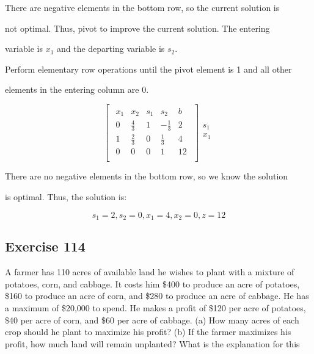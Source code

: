 \documentclass{article}
\begin{document}
There are negative elements in the bottom row, so the current solution is 

not optimal. Thus, pivot to improve the current solution. The entering 

variable is $x_1$ and the departing variable is $s_2$.

\vspace{\baselineskip}

Perform elementary row operations until the pivot element is 1 and all other 

elements in the entering column are 0.

\begin{equation*}
\begin{bmatrix}
\begin{array}{cccc|c}
x_1 & x_2 & s_1 & s_2 & b \\
\hline
0 & \frac{4}{3} & 1 & -\frac{1}{3} & 2 \\
1 & \frac{2}{3} & 0 & \frac{1}{3} & 4 \\
\hline
0 & 0 & 0 & 1 & 12 \\
\end{array}
\end{bmatrix}
\begin{array}{c}
\\
s_1 \\
x_1 \\
\\
\end{array}
\end{equation*}

There are no negative elements in the bottom row, so we know the solution 

is optimal. Thus, the solution is:

\begin{equation*}
s_1 = 2, s_2 = 0, x_1 = 4, x_2 = 0, z = 12
\end{equation*}
\subsection*{Exercise 114}
A farmer has 110 acres of available land he wishes to plant with a mixture of potatoes, corn, and
cabbage. It costs him \$400 to produce an acre of potatoes, \$160 to produce an acre of corn, and \$280 to produce
an acre of cabbage. He has a maximum of \$20,000 to spend. He makes a profit of \$120 per acre of potatoes, \$40
per acre of corn, and \$60 per acre of cabbage.
(a) How many acres of each crop should he plant to maximize his profit?
(b) If the farmer maximizes his profit, how much land will remain unplanted? What is the explanation for this
\end{document}
